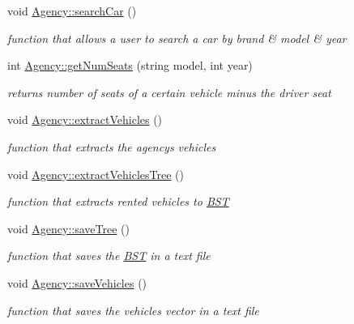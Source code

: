 \begin{DoxyCompactItemize}
\mbox{\label{group___agency_gaae7bafe5a3a5231ace9a73b9835c4c79}} 
void \hyperlink{group___agency_gaae7bafe5a3a5231ace9a73b9835c4c79}{Agency\+::search\+Car} ()
\begin{DoxyCompactList}\small\item\em function that allows a user to search a car by brand \& model \& year \end{DoxyCompactList}\item 
int \hyperlink{group___agency_ga55fd7b63ca65ffdb6dfe8694301af29c}{Agency\+::get\+Num\+Seats} (string model, int year)
\begin{DoxyCompactList}\small\item\em returns number of seats of a certain vehicle minus the driver seat \end{DoxyCompactList}\item 
\mbox{\label{group___agency_gaa9a66ffb449986839a0089fc7239ac54}} 
void \hyperlink{group___agency_gaa9a66ffb449986839a0089fc7239ac54}{Agency\+::extract\+Vehicles} ()
\begin{DoxyCompactList}\small\item\em function that extracts the agency\textquotesingle{}s vehicles \end{DoxyCompactList}\item 
\mbox{\label{group___agency_gaa88930db176fb321347b28e279699d4f}} 
void \hyperlink{group___agency_gaa88930db176fb321347b28e279699d4f}{Agency\+::extract\+Vehicles\+Tree} ()
\begin{DoxyCompactList}\small\item\em function that extracts rented vehicles to \hyperlink{class_b_s_t}{B\+ST} \end{DoxyCompactList}\item 
\mbox{\label{group___agency_ga33c07400077f762e86f9e5cf1292ef17}} 
void \hyperlink{group___agency_ga33c07400077f762e86f9e5cf1292ef17}{Agency\+::save\+Tree} ()
\begin{DoxyCompactList}\small\item\em function that saves the \hyperlink{class_b_s_t}{B\+ST} in a text file \end{DoxyCompactList}\item 
\mbox{\label{group___agency_ga7d290600e2b02d64db22c5bfcb61c94b}} 
void \hyperlink{group___agency_ga7d290600e2b02d64db22c5bfcb61c94b}{Agency\+::save\+Vehicles} ()
\begin{DoxyCompactList}\small\item\em function that saves the vehicles vector in a text file \end{DoxyCompactList}\end{DoxyCompactItemize}
